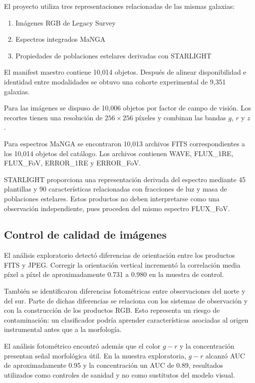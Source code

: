 \documentclass[letterpaper,11pt]{article}
\begin{document}
El proyecto utiliza tres representaciones relacionadas de las mismas galaxias:
\begin{enumerate} 
  \item Imágenes RGB de Legacy Survey
  \item Espectros integrados MaNGA
  \item Propiedades de poblaciones estelares derivadas con STARLIGHT
\end{enumerate}

El manifest maestro contiene 10,014 objetos. Después de alinear disponibilidad e identidad entre modalidades se obtuvo una cohorte experimental de 9,351 galaxias. 

Para las imágenes se dispuso de 10,006 objetos por factor de campo de visión. Los recortes tienen una resolución de $256\times256$ píxeles y combinan las bandas $g$, $r$ y $z$. 

Para espectros MaNGA se encontraron 10,013 archivos FITS correspondientes a los 10,014 objetos del catálogo. Los archivos contienen WAVE, FLUX\_1RE, FLUX\_FoV, ERROR\_1RE y ERROR\_FoV. 

STARLIGHT proporciona una representación derivada del espectro mediante 45 plantillas y 90 características relacionadas con fracciones de luz y masa de poblaciones estelares. Estos productos no deben interpretarse como una observación independiente, pues proceden del mismo espectro FLUX\_FoV.

\subsection{Control de calidad de imágenes} 

El análisis exploratorio detectó diferencias de orientación entre los productos FITS y JPEG. Corregir la orientación vertical incrementó la correlación media píxel a píxel de aproximadamente 0.731 a 0.980 en la muestra de control. 

También se identificaron diferencias fotométricas entre observaciones del norte y del sur. Parte de dichas diferencias se relaciona con los sistemas de observación y con la construcción de los productos RGB. Esto representa un riesgo de contaminación: un clasificador podría aprender características asociadas al origen instrumental antes que a la morfología. 

El análisis fotométrico encontró además que el color $g-r$ y la concentración presentan señal morfológica útil. En la muestra exploratoria, $g-r$ alcanzó AUC de aproximadamente 0.95 y la concentración un AUC de 0.89, resultados utilizados como controles de sanidad y no como sustitutos del modelo visual.
\end{document}
